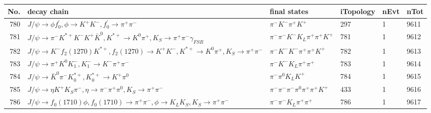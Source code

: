 \begin{table}[htbp] 
\begin{center}
\begin{small}
\begin{tabular}{rlllll}\hline\hline
 No. & decay chain & final states &  iTopology & nEvt & nTot \\\hline
780&$J/\psi       \rightarrow \phi           f^{'}_{0}     , \phi            \rightarrow K^{+}          K^{-}          , f^{'}_{0}      \rightarrow \pi^{+}        \pi^{-}        $&$\pi^{-}        K^{-}          \pi^{+}        K^{+}          $&  297&    1& 9611\\
781&$J/\psi       \rightarrow \pi^{-}        K^{*+}         K^{-}          K^{+}          \bar{K}^{0}   , K^{*+}          \rightarrow K^{0}          \pi^{+}        , K_{S}           \rightarrow \pi^{+}        \pi^{-}        \gamma_{FSR} $&$\pi^{-}        \pi^{-}        K^{-}          K_{L}          \pi^{+}        \pi^{+}        K^{+}          $&  781&    1& 9612\\
782&$J/\psi       \rightarrow K^{-}          f_{2}(1270)    K^{*+}         , f_{2}(1270)     \rightarrow K^{+}          K^{-}          , K^{*+}          \rightarrow K^{0}          \pi^{+}        , K_{S}           \rightarrow \pi^{+}        \pi^{-}        $&$\pi^{-}        K^{-}          K^{-}          \pi^{+}        \pi^{+}        K^{+}          $&  782&    1& 9613\\
783&$J/\psi       \rightarrow \pi^{+}        K^{0}          K_{1}^{-}      , K_{1}^{-}       \rightarrow K^{-}          \pi^{+}        \pi^{-}        $&$\pi^{-}        K^{-}          K_{L}          \pi^{+}        \pi^{+}        $&  783&    1& 9614\\
784&$J/\psi       \rightarrow \bar{K}^{0}   \pi^{-}        K_{0}^{*+}     , K_{0}^{*+}      \rightarrow K^{+}          \pi^{0}        $&$\pi^{-}        \pi^{0}        K_{L}          K^{+}          $&  784&    1& 9615\\
785&$J/\psi       \rightarrow \eta          K^{+}          K_{S}          \pi^{-}        , \eta           \rightarrow \pi^{-}        \pi^{+}        \pi^{0}        , K_{S}           \rightarrow \pi^{+}        \pi^{-}        $&$\pi^{-}        \pi^{-}        \pi^{-}        \pi^{0}        \pi^{+}        \pi^{+}        K^{+}          $&  433&    1& 9616\\
786&$J/\psi       \rightarrow f_{0}(1710)    \phi           , f_{0}(1710)     \rightarrow \pi^{+}        \pi^{-}        , \phi            \rightarrow K_{L}          K_{S}          , K_{S}           \rightarrow \pi^{+}        \pi^{-}        $&$\pi^{-}        \pi^{-}        K_{L}          \pi^{+}        \pi^{+}        $&  786&    1& 9617\\

\end{tabular}
\end{small}
\end{center}
\end{table}
